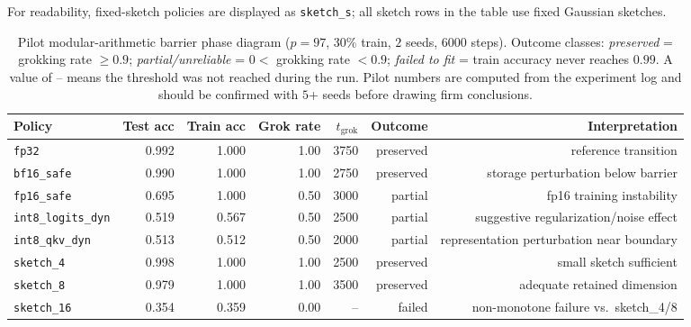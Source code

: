 For readability, fixed-sketch policies are displayed as \texttt{sketch\_s}; all sketch rows in the table use fixed Gaussian sketches.

\begin{table}[ht]
\centering
\caption{Pilot modular-arithmetic barrier phase diagram ($p=97$, 30\% train, $2$ seeds, $6000$ steps). Outcome classes: \emph{preserved} = grokking rate $\ge 0.9$; \emph{partial/unreliable} = $0 < $ grokking rate $< 0.9$; \emph{failed to fit} = train accuracy never reaches $0.99$. A value of -- means the threshold was not reached during the run. Pilot numbers are computed from the experiment log and should be confirmed with $5$+ seeds before drawing firm conclusions.}
\label{tab:grokking}
\small
\begin{tabular}{lrrrrrr}
\toprule
Policy & Test acc & Train acc & Grok rate & $t_{\mathrm{grok}}$ & Outcome & Interpretation \\
\midrule
\texttt{fp32}                 & 0.992 & 1.000 & 1.00 & 3750 & preserved & reference transition \\
\texttt{bf16\_safe}           & 0.990 & 1.000 & 1.00 & 2750 & preserved & storage perturbation below barrier \\
\texttt{fp16\_safe}           & 0.695 & 1.000 & 0.50 & 3000 & partial & fp16 training instability \\
\texttt{int8\_logits\_dyn}    & 0.519 & 0.567 & 0.50 & 2500 & partial & suggestive regularization/noise effect \\
\texttt{int8\_qkv\_dyn}       & 0.513 & 0.512 & 0.50 & 2000 & partial & representation perturbation near boundary \\
\texttt{sketch\_4}            & 0.998 & 1.000 & 1.00 & 2500 & preserved & small sketch sufficient \\
\texttt{sketch\_8}            & 0.979 & 1.000 & 1.00 & 3500 & preserved & adequate retained dimension \\
\texttt{sketch\_16}           & 0.354 & 0.359 & 0.00 & --   & failed & non-monotone failure vs.\ sketch\_4/8 \\
\bottomrule
\end{tabular}
\end{table}

